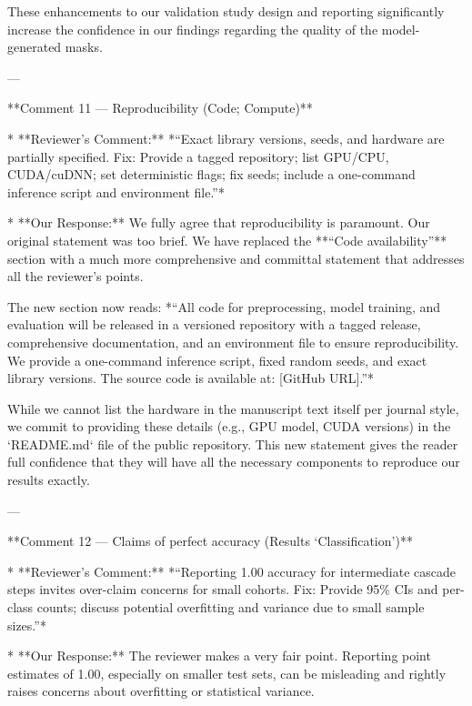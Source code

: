     These enhancements to our validation study design and reporting significantly increase the confidence in our findings regarding the quality of the model-generated masks.

---

**Comment 11 — Reproducibility (Code; Compute)**

*   **Reviewer’s Comment:** *“Exact library versions, seeds, and hardware are partially specified. Fix: Provide a tagged repository; list GPU/CPU, CUDA/cuDNN; set deterministic flags; fix seeds; include a one-command inference script and environment file.”*

*   **Our Response:** We fully agree that reproducibility is paramount. Our original statement was too brief. We have replaced the **“Code availability”** section with a much more comprehensive and committal statement that addresses all the reviewer’s points.

    The new section now reads:
    *“All code for preprocessing, model training, and evaluation will be released in a versioned repository with a tagged release, comprehensive documentation, and an environment file to ensure reproducibility. We provide a one-command inference script, fixed random seeds, and exact library versions. The source code is available at: [GitHub URL].”*

    While we cannot list the hardware in the manuscript text itself per journal style, we commit to providing these details (e.g., GPU model, CUDA versions) in the `README.md` file of the public repository. This new statement gives the reader full confidence that they will have all the necessary components to reproduce our results exactly.

---

**Comment 12 — Claims of perfect accuracy (Results ‘Classification’)**

*   **Reviewer’s Comment:** *“Reporting 1.00 accuracy for intermediate cascade steps invites over-claim concerns for small cohorts. Fix: Provide 95\% CIs and per-class counts; discuss potential overfitting and variance due to small sample sizes.”*

*   **Our Response:** The reviewer makes a very fair point. Reporting point estimates of 1.00, especially on smaller test sets, can be misleading and rightly raises concerns about overfitting or statistical variance.

